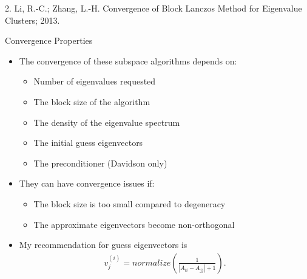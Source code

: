 \documentclass[10pt]{beamer}
\begin{document}
{{{{{{{{{{{{{{ 2. Li, R.-C.; Zhang, L.-H. Convergence of Block Lanczos Method for Eigenvalue Clusters; 2013.}
\begin{frame}{Convergence Properties}
	\begin{itemize}[<+->]
		\item{The convergence of these subspace algorithms depends on:}
		\begin{itemize}
			\item{\alert{Number of eigenvalues} requested}
			\item{The \alert{block size} of the algorithm}
			\item{The \alert{density} of the eigenvalue spectrum}
			\item{The \alert{initial guess} eigenvectors}
			\item{The \alert{preconditioner} (Davidson only)}
		\end{itemize}
		\item{They can \alert{have convergence issues} if:}
		\begin{itemize}
			\item{The block size is too small compared to degeneracy}
			\item{The approximate eigenvectors become non-orthogonal}
		\end{itemize}
		\item{My recommendation for guess eigenvectors is
		\begin{eqnarray}
			v_j^{(i)} = normalize\left(\frac{1}{|A_{ii} - A_{jj}| + 1} \right).
		\end{eqnarray}
		}
	\end{itemize}
\end{frame}

{%

}}}}}}}}}}}}}}
\end{document}
